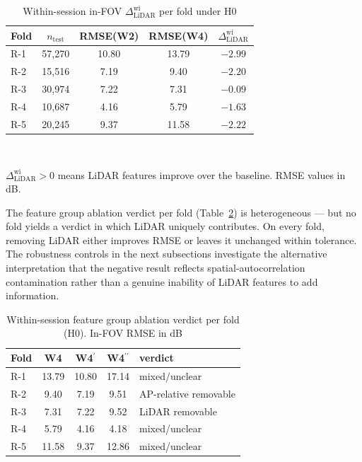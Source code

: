 \documentclass[conference]{IEEEtran}
\newcommand{\dlidarw}{\ensuremath{\Delta_{\mathrm{LiDAR}}^{\mathrm{wi}}}}
\begin{document}
\vspace{-6pt}
\begin{table}[!htbp]
    \caption{Within-session in-FOV $\dlidarw$ per fold under H0}
    \label{tab:wlro-headline}
    \centering
    \footnotesize
    \begin{tabular}{l c c c c}
        \toprule
        Fold & $n_{\text{test}}$ & RMSE(W2) & RMSE(W4) & $\dlidarw$ \\
        \midrule
        R-1 & 57{,}270 & 10.80 & 13.79 & $-2.99$ \\
        R-2 & 15{,}516 & 7.19  & 9.40  & $-2.20$ \\
        R-3 & 30{,}974 & 7.22  & 7.31  & $-0.09$ \\
        R-4 & 10{,}687 & 4.16  & 5.79  & $-1.63$ \\
        R-5 & 20{,}245 & 9.37  & 11.58 & $-2.22$ \\
        \bottomrule
    \end{tabular}
    \\[3pt]
    \raggedright
    \footnotesize
    $\dlidarw > 0$ means LiDAR features improve over the baseline. RMSE values in dB.
\end{table}

The feature group ablation verdict per fold (Table~\ref{tab:wlro-disambig}) is heterogeneous --- but no fold yields a verdict in which LiDAR uniquely contributes. On every fold, removing LiDAR either improves RMSE or leaves it unchanged within tolerance. The robustness controls in the next subsections investigate the alternative interpretation that the negative result reflects spatial-autocorrelation contamination rather than a genuine inability of LiDAR features to add information.

\vspace{-6pt}
\begin{table}[!htbp]
    \caption{Within-session feature group ablation verdict per fold (H0). In-FOV RMSE in dB}
    \label{tab:wlro-disambig}
    \centering
    \footnotesize
    \begin{tabular}{l c c c l}
        \toprule
        Fold & W4 & W4$^\prime$ & W4$^{\prime\prime}$ & verdict \\
        \midrule
        R-1 & 13.79 & 10.80 & 17.14 & mixed/unclear \\
        R-2 &  9.40 &  7.19 &  9.51 & AP-relative removable \\
        R-3 &  7.31 &  7.22 &  9.52 & LiDAR removable \\
        R-4 &  5.79 &  4.16 &  4.18 & mixed/unclear \\
        R-5 & 11.58 &  9.37 & 12.86 & mixed/unclear \\
        \bottomrule
    \end{tabular}
\end{table}
\end{document}
